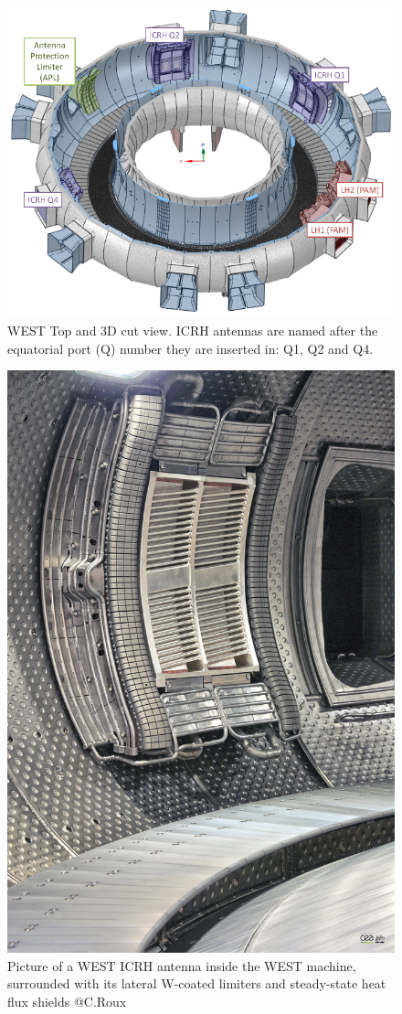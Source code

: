 \documentclass[12p]{iopart}
\begin{document}
\begin{figure}
	\centering
	\includegraphics[width=0.95\linewidth]{figures/WEST_overview}
	\caption{WEST Top and 3D cut view. ICRH antennas are named after the equatorial port (Q) number they are inserted in: Q1, Q2 and Q4.}
	\label{fig:westoverview}
\end{figure}

\begin{figure}
	\centering
	\includegraphics[width=0.7\linewidth]{figures/6}
	\caption{Picture of a WEST ICRH antenna inside the WEST machine, surrounded with its lateral W-coated limiters and steady-state heat flux shields @C.Roux}
	\label{fig:ICRH_antenna_inside_WEST}
\end{figure}
\end{document}
